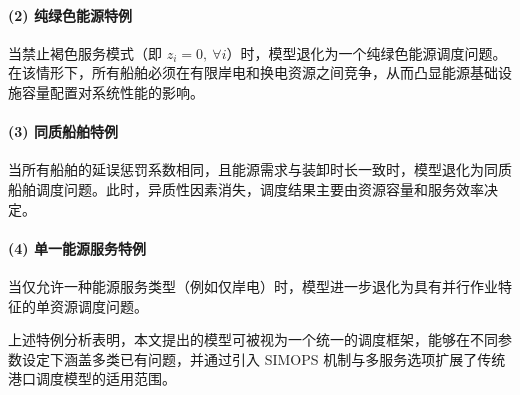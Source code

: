 \documentclass[UTF8, a4paper, 12pt]{ctexart}
\begin{document}
\paragraph{(2) 纯绿色能源特例}
当禁止褐色服务模式（即 $z_i=0,\ \forall i$）时，模型退化为一个纯绿色能源调度问题。在该情形下，所有船舶必须在有限岸电和换电资源之间竞争，从而凸显能源基础设施容量配置对系统性能的影响。

\paragraph{(3) 同质船舶特例}
当所有船舶的延误惩罚系数相同，且能源需求与装卸时长一致时，模型退化为同质船舶调度问题。此时，异质性因素消失，调度结果主要由资源容量和服务效率决定。

\paragraph{(4) 单一能源服务特例}
当仅允许一种能源服务类型（例如仅岸电）时，模型进一步退化为具有并行作业特征的单资源调度问题。

上述特例分析表明，本文提出的模型可被视为一个统一的调度框架，能够在不同参数设定下涵盖多类已有问题，并通过引入 SIMOPS 机制与多服务选项扩展了传统港口调度模型的适用范围。



\end{document}
